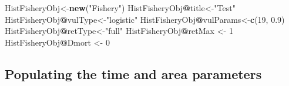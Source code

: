 \documentclass[
]{book}
\newenvironment{Shaded}{\begin{snugshade}}{\end{snugshade}}
\newcommand{\DecValTok}[1]{\textcolor[rgb]{0.00,0.00,0.81}{#1}}
\newcommand{\FloatTok}[1]{\textcolor[rgb]{0.00,0.00,0.81}{#1}}
\newcommand{\FunctionTok}[1]{\textcolor[rgb]{0.13,0.29,0.53}{\textbf{#1}}}
\newcommand{\NormalTok}[1]{#1}
\newcommand{\OtherTok}[1]{\textcolor[rgb]{0.56,0.35,0.01}{#1}}
\newcommand{\SpecialCharTok}[1]{\textcolor[rgb]{0.81,0.36,0.00}{\textbf{#1}}}
\newcommand{\StringTok}[1]{\textcolor[rgb]{0.31,0.60,0.02}{#1}}
\begin{document}
\begin{Shaded}
\begin{Highlighting}[]
\NormalTok{HistFisheryObj}\OtherTok{\textless{}{-}}\FunctionTok{new}\NormalTok{(}\StringTok{"Fishery"}\NormalTok{)}
\NormalTok{HistFisheryObj}\SpecialCharTok{@}\NormalTok{title}\OtherTok{\textless{}{-}}\StringTok{"Test"}
\NormalTok{HistFisheryObj}\SpecialCharTok{@}\NormalTok{vulType}\OtherTok{\textless{}{-}}\StringTok{"logistic"}
\NormalTok{HistFisheryObj}\SpecialCharTok{@}\NormalTok{vulParams}\OtherTok{\textless{}{-}}\FunctionTok{c}\NormalTok{(}\DecValTok{19}\NormalTok{, }\FloatTok{0.9}\NormalTok{)}
\NormalTok{HistFisheryObj}\SpecialCharTok{@}\NormalTok{retType}\OtherTok{\textless{}{-}}\StringTok{"full"}
\NormalTok{HistFisheryObj}\SpecialCharTok{@}\NormalTok{retMax }\OtherTok{\textless{}{-}} \DecValTok{1}
\NormalTok{HistFisheryObj}\SpecialCharTok{@}\NormalTok{Dmort }\OtherTok{\textless{}{-}} \DecValTok{0}
\end{Highlighting}
\end{Shaded}

\subsection{Populating the time and area parameters}\label{populating-the-time-and-area-parameters}
\end{document}
